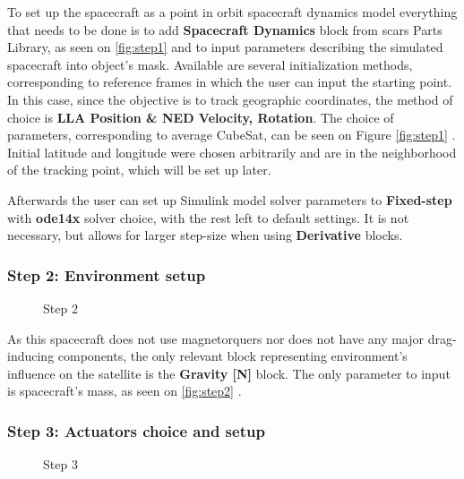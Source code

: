            To set up the spacecraft as a point in orbit spacecraft dynamics model everything that needs to be done is to add \textbf{Spacecraft Dynamics} block from \ac{scars} Parts Library, as seen on \autoref{fig:step1}  and to input parameters describing the simulated spacecraft into object's mask. Available are several initialization methods, corresponding to reference frames in which the user can input the starting point. In this case, since the objective is to track geographic coordinates, the method of choice is \textbf{LLA Position \& NED Velocity, Rotation}. The choice of parameters, corresponding to average CubeSat, can be seen on Figure \autoref{fig:step1} . Initial latitude and longitude were chosen arbitrarily and are in the neighborhood of the tracking point, which will be set up later.
            
            Afterwards the user can set up Simulink model solver parameters to \textbf{Fixed-step} with \textbf{ode14x} solver choice, with the rest left to default settings. It is not necessary, but allows for larger step-size when using \textbf{Derivative} blocks.

        \subsubsection*{Step 2: Environment setup}
            \begin{figure}[H]
                \centering
                \qquad
                \caption{Step 2}%
                \label{fig:step2}%
            \end{figure}

            As this spacecraft does not use magnetorquers nor does not have any major drag-inducing components, the only relevant block representing environment's influence on the satellite is the \textbf{Gravity [N]} block. The only parameter to input is spacecraft's mass, as seen on \autoref{fig:step2} .

        \subsubsection*{Step 3: Actuators choice and setup}
            \begin{figure}[H]
                \centering
                \qquad
                \caption{Step 3}%
                \label{fig:step3}%
            \end{figure}

